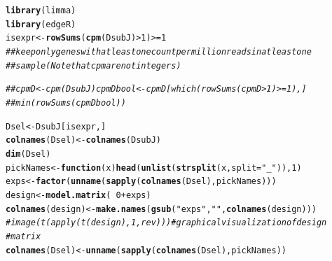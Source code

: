 \documentclass[a4paper]{article}
\makeatletter
\newcommand{\hlnum}[1]{\textcolor[rgb]{0.686,0.059,0.569}{#1}}%
\newcommand{\hlstr}[1]{\textcolor[rgb]{0.192,0.494,0.8}{#1}}%
\newcommand{\hlcom}[1]{\textcolor[rgb]{0.678,0.584,0.686}{\textit{#1}}}%
\newcommand{\hlopt}[1]{\textcolor[rgb]{0,0,0}{#1}}%
\newcommand{\hlstd}[1]{\textcolor[rgb]{0.345,0.345,0.345}{#1}}%
\newcommand{\hlkwa}[1]{\textcolor[rgb]{0.161,0.373,0.58}{\textbf{#1}}}%
\newcommand{\hlkwb}[1]{\textcolor[rgb]{0.69,0.353,0.396}{#1}}%
\newcommand{\hlkwc}[1]{\textcolor[rgb]{0.333,0.667,0.333}{#1}}%
\newcommand{\hlkwd}[1]{\textcolor[rgb]{0.737,0.353,0.396}{\textbf{#1}}}%
\newenvironment{kframe}{%
 \def\at@end@of@kframe{}%
 \ifinner\ifhmode%
  \def\at@end@of@kframe{\end{minipage}}%
  \begin{minipage}{\columnwidth}%
 \fi\fi%
 \def\FrameCommand##1{\hskip\@totalleftmargin \hskip-\fboxsep
 \colorbox{shadecolor}{##1}\hskip-\fboxsep
     \hskip-\linewidth \hskip-\@totalleftmargin \hskip\columnwidth}%
 \MakeFramed {\advance\hsize-\width
   \@totalleftmargin\z@ \linewidth\hsize
   \@setminipage}}%
 {\par\unskip\endMakeFramed%
 \at@end@of@kframe}
\newenvironment{knitrout}{}{} %
\makeatother
\begin{document}
\begin{knitrout}
\color{fgcolor}\begin{kframe}
\begin{alltt}
\hlkwd{library}\hlstd{(limma)}
\hlkwd{library}\hlstd{(edgeR)}
\hlstd{isexpr} \hlkwb{<-} \hlkwd{rowSums}\hlstd{(}\hlkwd{cpm}\hlstd{(DsubJ)} \hlopt{>} \hlnum{1}\hlstd{)} \hlopt{>=} \hlnum{1}
\hlcom{## keep only genes with at least one count per million reads in at least one}
\hlcom{## sample (Note that cpm are not integers)}

\hlcom{## cpmD <- cpm(DsubJ) cpmDbool <- cpmD[which(rowSums(cpmD>1) >= 1),]}
\hlcom{## min(rowSums(cpmDbool))}

\hlstd{Dsel} \hlkwb{<-} \hlstd{DsubJ[isexpr, ]}
\hlkwd{colnames}\hlstd{(Dsel)} \hlkwb{<-} \hlkwd{colnames}\hlstd{(DsubJ)}
\hlkwd{dim}\hlstd{(Dsel)}
\hlstd{pickNames} \hlkwb{<-} \hlkwa{function}\hlstd{(}\hlkwc{x}\hlstd{)} \hlkwd{head}\hlstd{(}\hlkwd{unlist}\hlstd{(}\hlkwd{strsplit}\hlstd{(x,} \hlkwc{split} \hlstd{=} \hlstr{"_"}\hlstd{)),} \hlnum{1}\hlstd{)}
\hlstd{exps} \hlkwb{<-} \hlkwd{factor}\hlstd{(}\hlkwd{unname}\hlstd{(}\hlkwd{sapply}\hlstd{(}\hlkwd{colnames}\hlstd{(Dsel), pickNames)))}
\hlstd{design} \hlkwb{<-} \hlkwd{model.matrix}\hlstd{(}\hlopt{~}\hlnum{0} \hlopt{+} \hlstd{exps)}
\hlkwd{colnames}\hlstd{(design)} \hlkwb{<-} \hlkwd{make.names}\hlstd{(}\hlkwd{gsub}\hlstd{(}\hlstr{"exps"}\hlstd{,} \hlstr{""}\hlstd{,} \hlkwd{colnames}\hlstd{(design)))}
\hlcom{# image(t(apply(t(design), 1, rev)) ) # graphical visualization of design}
\hlcom{# matrix}
\hlkwd{colnames}\hlstd{(Dsel)} \hlkwb{<-} \hlkwd{unname}\hlstd{(}\hlkwd{sapply}\hlstd{(}\hlkwd{colnames}\hlstd{(Dsel), pickNames))}
\end{alltt}
\end{kframe}
\end{knitrout}
\end{document}
